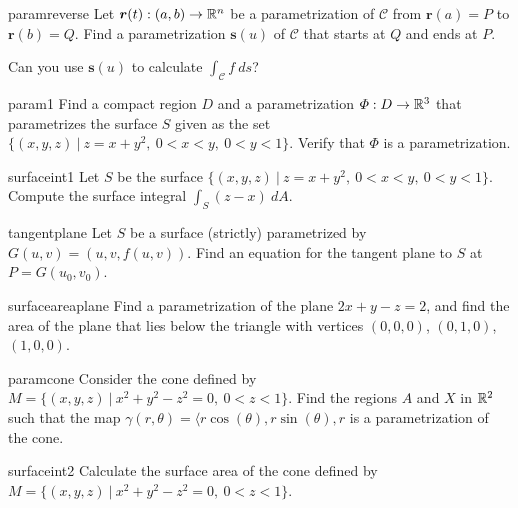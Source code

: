 \begin{problem}{paramreverse}
    Let $\bm{r}(t) : (a,b) \to \mathbb{R}^n$ be a parametrization of $\mathcal{C}$ from $\bm{r}(a) = P$ to $\bm{r}(b) = Q$.  Find a parametrization $\bm{s}(u)$ of $\mathcal{C}$ that starts at $Q$ and ends at $P$.

    \begin{subproblems}
    \item Can you use $\bm{s}(u)$ to calculate $\int_\mathcal{C} f \ ds$?
    \end{subproblems}
\end{problem}


\begin{problem}{param1}
 Find a compact region $D$ and a parametrization $\Phi : D \to \mathbb{R}^3$ that parametrizes the surface $S$ given as the set $\{(x,y,z) \ | \ z = x+y^2, \ 0 < x < y, \ 0 < y < 1 \}$.  Verify that $\Phi$ is a parametrization.
\end{problem}

\begin{problem}{surfaceint1}
    Let $S$ be the surface $\{(x,y,z) \ | \ z = x+y^2, \ 0 < x < y, \ 0 < y < 1 \}$.
    Compute the surface integral $\int_S (z-x) \ dA$.
\end{problem}

\begin{problem}{tangentplane}
    Let $S$ be a surface (strictly) parametrized by $G(u,v) = (u,v, f(u,v))$.  Find an equation for the tangent plane to $S$ at $P = G(u_0,v_0)$.
\end{problem}

\begin{problem}{surfaceareaplane}
    Find a parametrization of the plane $2x+y-z=2$, and find the area of the plane that lies below the triangle with vertices $(0,0,0)$, $(0,1,0)$, $(1,0,0)$.
    
\end{problem}

\begin{problem}{paramcone}
     Consider the cone defined by $M = \{(x,y,z) \ | \ x^2 + y^2 - z^2 = 0, \ 0 < z < 1\}$.  Find the regions $A$ and $X$ in $\mathbb{R}^2$ such that the map $\gamma(r,\theta) = \langle r\cos(\theta), r\sin(\theta), r$ is a parametrization of the cone.
\end{problem}

\begin{problem}{surfaceint2}
    Calculate the surface area of the cone defined by $M = \{(x,y,z) \ | \ x^2 + y^2 - z^2 = 0, \ 0 < z < 1\}$.
\end{problem}


